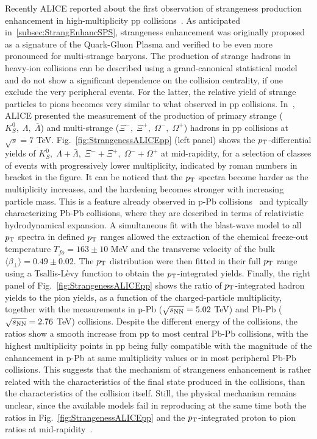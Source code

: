 Recently ALICE reported about the first observation of strangeness production enhancement in high-multiplicity pp collisions~\cite{ALICE:2017jyt}. As anticipated in~\ref{subsec:StrangEnhancSPS}, strangeness enhancement was originally proposed as a signature of the Quark-Gluon Plasma and verified to be even more pronounced for multi-strange baryons. The production of strange hadrons in heavy-ion collisions can be described using a grand-canonical statistical model and do not show a significant dependence on the collision centrality, if one exclude the very peripheral events. For the latter, the relative yield of strange particles to pions becomes very similar to what observed in pp collisions. In~\cite{ALICE:2017jyt}, ALICE presented the measurement of the production of primary strange ($K^0_S,\; \Lambda,\; \bar{\Lambda}$) and multi-strange ($\Xi^-,\; \Xi^+,\; \Omega^-,\; \Omega^+$) hadrons in pp collisions at $\sqrt{s} = 7$ TeV. Fig.~\ref{fig:StrangenessALICEpp} (left panel) shows the $p_{\rm T}$-differential yields of $K^0_S,\; \Lambda + \bar{\Lambda},\; \Xi^- + \Xi^+,\; \Omega^- + \Omega^+$ at mid-rapidity, for a selection of classes of events with progressively lower multiplicity, indicated by roman numbers in bracket in the figure. It can be noticed that the $p_{\rm T}$ spectra become harder as the multiplicity increases, and the hardening becomes stronger with increasing particle mass. This is a feature already observed in p-Pb collisions~\cite{Abelev:2013haa} and typically characterizing Pb-Pb collisions, where they are described in terms of relativistic hydrodynamical expansion. A simultaneous fit with the blast-wave model to all $p_{\rm T}$ spectra in defined $p_{\rm T}$ ranges allowed the extraction of the chemical freeze-out temperature $T_{fo} = 163 \pm 10$ MeV and the transverse velocity of the bulk $\langle \beta_{\perp} \rangle = 0.49 \pm 0.02$. The $p_{\rm T}$ distribution were then fitted in their full $p_{\rm T}$ range using a Tsallis-Lèvy function to obtain the $p_{\rm T}$-integrated yields. Finally, the right panel of Fig.~\ref{fig:StrangenessALICEpp} shows the ratio of $p_{\rm T}$-integrated hadron yields to the pion yields, as a function of the charged-particle multiplicity, together with the measurements in p-Pb ($\sqrt{s_{\rm NN}} = 5.02$ TeV) and Pb-Pb ($\sqrt{s_{\rm NN}} = 2.76$ TeV) collisions. Despite the different energy of the collisions, the ratios show a smooth increase from pp to most central Pb-Pb collisions, with the highest multiplicity points in pp being fully compatible with the magnitude of the enhancement in p-Pb at same multiplicity values or in most peripheral Pb-Pb collisions. This suggests that the mechanism of strangeness enhancement is rather related with the characteristics of the final state produced in the collisions, than the characteristics of the collision itself. Still, the physical mechanism remains unclear, since the available models fail in reproducing at the same time both the ratios in Fig.~\ref{fig:StrangenessALICEpp} and the $p_{\rm T}$-integrated proton to pion ratios at mid-rapidity~\cite{ALICE:2017jyt}.
